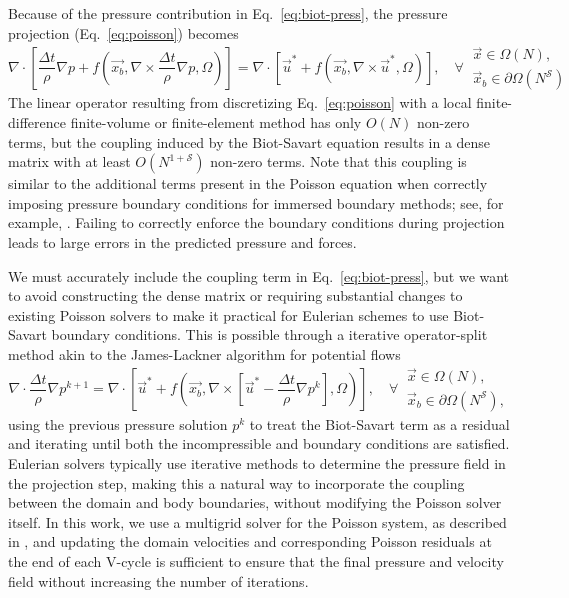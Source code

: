\documentclass[11pt]{article}
\begin{document}
Because of the pressure contribution in Eq.~\ref{eq:biot-press}, the pressure projection (Eq.~\ref{eq:poisson}) becomes
\begin{equation}\label{eq:complex_poisson}
    \nabla\cdot\left[\frac{\Delta t}{\rho}\nabla p + f\left(\vec{x_b},\nabla\times\frac{\Delta t}{\rho}\nabla p,\Omega\right)\right] = \nabla\cdot\left[ \vec{u}^* + f(\vec{x_b},\nabla\times\vec{u}^*,\Omega)\right], \quad\forall\
    \begin{array}{l}
    \vec{x} \in \Omega(N),\\
    \vec{x}_b \in \partial\Omega(N^\mathcal{S})
    \end{array}
\end{equation}
The linear operator resulting from discretizing Eq.~\ref{eq:poisson} with a local finite-difference finite-volume or finite-element method has only $O(N)$ non-zero terms, but the coupling induced by the Biot-Savart equation results in a dense matrix with at least $O(N^{1+\mathcal{S}})$ non-zero terms. Note that this coupling is similar to the additional terms present in the Poisson equation when correctly imposing pressure boundary conditions for immersed boundary methods; see, for example, \cite{Taira2007, Lauber2022}. Failing to correctly enforce the boundary conditions during projection leads to large errors in the predicted pressure and forces.

We must accurately include the coupling term in Eq.~\ref{eq:biot-press}, but we want to avoid constructing the dense matrix or requiring substantial changes to existing Poisson solvers to make it practical for Eulerian schemes to use Biot-Savart boundary conditions. This is possible through a iterative operator-split method akin to the James-Lackner algorithm for potential flows
\begin{equation}\label{eq:differed_poisson}
    \nabla\cdot\frac{\Delta t}{\rho}\nabla p^{k+1} = \nabla\cdot\left[ \vec{u}^* + f\left(\vec{x_b},\nabla\times\left[\vec{u}^*-\frac{\Delta t}{\rho}\nabla p^k\right],\Omega\right)\right], \quad\forall\
    \begin{array}{l}
    \vec{x} \in \Omega(N),\\
    \vec{x}_b \in \partial\Omega(N^\mathcal{S}),
    \end{array}
\end{equation}
using the previous pressure solution $p^k$ to treat the Biot-Savart term as a residual and iterating until both the incompressible and boundary conditions are satisfied. Eulerian solvers typically use iterative methods to determine the pressure field in the projection step, making this a natural way to incorporate the coupling between the domain and body boundaries, without modifying the Poisson solver itself. In this work, we use a multigrid solver for the Poisson system, as described in \cite{Weymouth2022Data-drivenProjection}, and updating the domain velocities and corresponding Poisson residuals at the end of each V-cycle is sufficient to ensure that the final pressure and velocity field without increasing the number of iterations.
\end{document}
